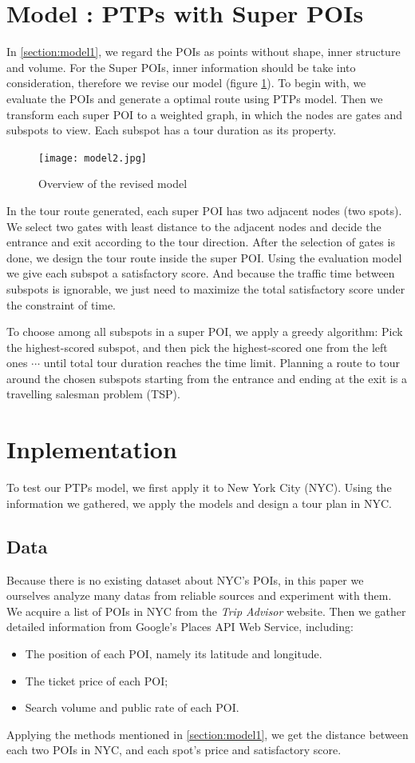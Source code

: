 \documentclass{mcmthesis}
\newcommand{\RNum}[1]{\uppercase\expandafter{\romannumeral #1\relax}}
\begin{document}
\section{Model \RNum{2}: PTPs with Super POIs} \label{section:model2}
  In \ref{section:model1}, we regard the POIs as points without shape, inner structure and volume. For the Super POIs, inner information should be take into consideration, therefore we revise our model (figure \ref{fig:model2}). To begin with, we evaluate the POIs and generate a optimal route using PTPs model. Then we transform each super POI to a weighted graph, in which the nodes are gates and subspots to view. Each subspot has a tour duration as its property. \par
  \begin{figure}[ht]
    \centering
    \texttt{[image: model2.jpg]}
    \caption{Overview of the revised model}
    \label{fig:model2}
  \end{figure}
  In the tour route generated, each super POI has two adjacent nodes (two spots). We select two gates with least distance to the adjacent nodes and decide the entrance and exit according to the tour direction. After the selection of gates is done, we design the tour route inside the super POI. Using the evaluation model we give each subspot a satisfactory score. And because the traffic time between subspots is ignorable, we just need to maximize the total satisfactory score under the constraint of time. \par
  To choose among all subspots in a super POI, we apply a greedy algorithm: Pick the highest-scored subspot, and then pick the highest-scored one from the left ones $\cdots$ until total tour duration reaches the time limit. Planning a route to tour around the chosen subspots starting from the entrance and ending at the exit is a travelling salesman problem (TSP).




\section{Inplementation}
  To test our PTPs model, we first apply it to New York City (NYC). Using the information we gathered, we apply the models and design a tour plan in NYC.
\subsection{Data}
  Because there is no existing dataset about NYC's POIs, in this paper we ourselves analyze many datas from reliable sources and experiment with them. We acquire a list of POIs in NYC from the \emph{Trip Advisor} website\cite{TripAdv}. Then we gather detailed information from Google's Places API Web Service\cite{GMaps}, including:
  \begin{itemize}
    \item The position of each POI, namely its latitude and longitude.
    \item The ticket price of each POI;
    \item Search volume and public rate of each POI.
  \end{itemize}
  Applying the methods mentioned in \ref{section:model1}, we get the distance between each two POIs in NYC, and each spot's price and satisfactory score. 
\end{document}
